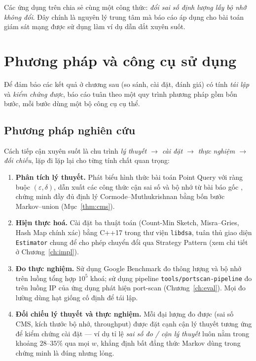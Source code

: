 \bigskip

Các ứng dụng trên chia sẻ cùng một công thức: \textit{đổi sai số định lượng lấy bộ nhớ không đổi}. Đây chính là nguyên lý trung tâm mà báo cáo áp dụng cho bài toán giám sát mạng được sử dụng làm ví dụ dẫn dắt xuyên suốt.

\section{Phương pháp và công cụ sử dụng}
\label{sec:methods-and-tools}

Để đảm bảo các kết quả ở chương sau (so sánh, cài đặt, đánh giá) có tính \textit{tái lập} và \textit{kiểm chứng được}, báo cáo tuân theo một quy trình phương pháp gồm bốn bước, mỗi bước dùng một bộ công cụ cụ thể.

\subsection{Phương pháp nghiên cứu}
\label{sec:methodology}

Cách tiếp cận xuyên suốt là chu trình \textit{lý thuyết $\rightarrow$ cài đặt $\rightarrow$ thực nghiệm $\rightarrow$ đối chiếu}, lặp đi lặp lại cho từng tính chất quan trọng:

\begin{enumerate}
  \item \textbf{Phân tích lý thuyết.} Phát biểu hình thức bài toán Point Query với ràng buộc $(\varepsilon, \delta)$, dẫn xuất các công thức cận sai số và bộ nhớ từ bài báo gốc \cite{cormode2005cms,misra1982finding}, chứng minh đầy đủ định lý Cormode--Muthukrishnan bằng bốn bước Markov–union (Mục~\ref{thm:cms}).
  \item \textbf{Hiện thực hoá.} Cài đặt ba thuật toán (Count-Min Sketch, Misra--Gries, Hash Map chính xác) bằng C++17 trong thư viện \texttt{libdsa}, tuân thủ giao diện \texttt{Estimator} chung để cho phép chuyển đổi qua Strategy Pattern (xem chi tiết ở Chương~\ref{ch:impl}).
  \item \textbf{Đo thực nghiệm.} Sử dụng Google Benchmark đo thông lượng và bộ nhớ trên luồng tổng hợp $10^5$ khoá; sử dụng pipeline \texttt{tools/portscan-pipeline} đo trên luồng IP của ứng dụng phát hiện port-scan (Chương~\ref{ch:eval}). Mọi đo lường dùng hạt giống cố định để tái lập.
  \item \textbf{Đối chiếu lý thuyết và thực nghiệm.} Mỗi đại lượng đo được (sai số CMS, kích thước bộ nhớ, throughput) được đặt cạnh cận lý thuyết tương ứng để kiểm chứng cài đặt --- ví dụ tỉ lệ \textit{sai số đo / cận lý thuyết} luôn nằm trong khoảng $28$--$35\%$ qua mọi $w$, khẳng định bất đẳng thức Markov dùng trong chứng minh là đúng nhưng lỏng.
\end{enumerate}


